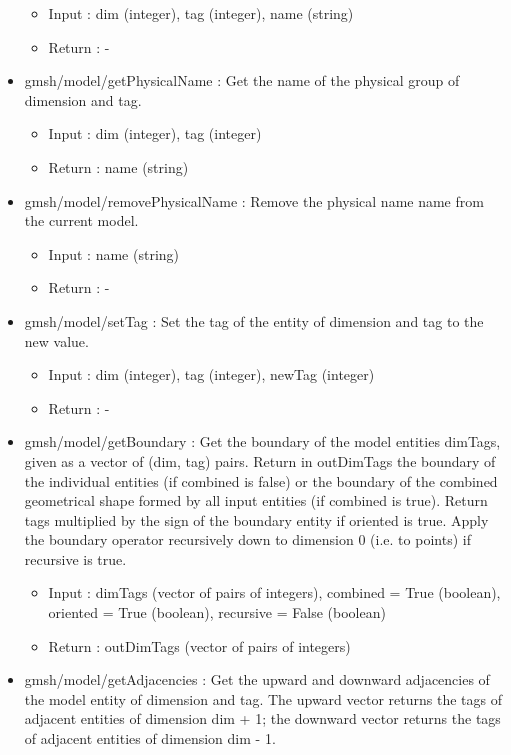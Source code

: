 \documentclass[dvipdfmx, 9pt, a4paper]{article}
\numberwithin{equation}{section}
\begin{document}
\begin{itemize}
\begin{itemize}
\item Input : dim (integer), tag (integer), name (string)
\item Return : -
\end{itemize}
\item gmsh/model/getPhysicalName : Get the name of the physical group of dimension and tag.
\begin{itemize}
\item Input : dim (integer), tag (integer)
\item Return : name (string)
\end{itemize}
\item gmsh/model/removePhysicalName : Remove the physical name name from the current model.
\begin{itemize}
\item Input : name (string)
\item Return : -
\end{itemize}
\item gmsh/model/setTag : Set the tag of the entity of dimension and tag to the new value.
\begin{itemize}
\item Input : dim (integer), tag (integer), newTag (integer)
\item Return : -
\end{itemize}
\item gmsh/model/getBoundary : Get the boundary of the model entities dimTags, given as a vector of (dim, tag) pairs. Return in outDimTags the boundary of the individual entities (if combined is false) or the boundary of the combined geometrical shape formed by all input entities (if combined is true). Return tags multiplied by the sign of the boundary entity if oriented is true. Apply the boundary operator recursively down to dimension 0 (i.e. to points) if recursive is true.
\begin{itemize}
\item Input : dimTags (vector of pairs of integers), combined = True (boolean), oriented = True (boolean), recursive = False (boolean)
\item Return : outDimTags (vector of pairs of integers)
\end{itemize}
\item gmsh/model/getAdjacencies : Get the upward and downward adjacencies of the model entity of dimension and tag. The upward vector returns the tags of adjacent entities of dimension dim + 1; the downward vector returns the tags of adjacent entities of dimension dim - 1.

\end{itemize}
\end{document}

